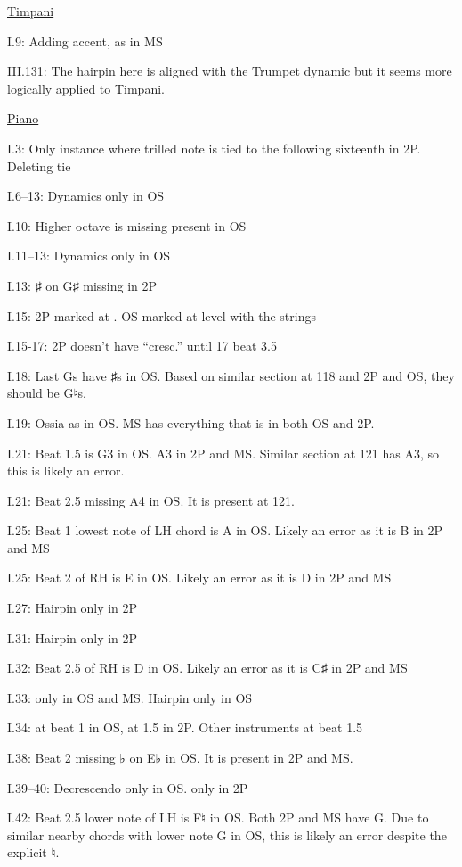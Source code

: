 \documentclass[twoside]{article}
\newcommand\dynmark[1]{\scalebox{0.9}{#1}{\kern1pt}}
\begin{document}
\begin{hangparas}{15pt}{1}
\begin{multicols}{2}
\underline{Timpani}

I.9: Adding accent, as in MS

III.131: The hairpin here is aligned with the Trumpet dynamic but it seems more logically applied to Timpani.

\underline{Piano}

I.3: Only instance where trilled note is tied to the following sixteenth in 2P. Deleting tie

I.6--13: Dynamics only in OS

I.10: Higher octave is missing present in OS

I.11--13: Dynamics only in OS

I.13: ♯ on G♯ missing in 2P

I.15: 2P marked at \dynmark{\pp}. OS marked at \dynmark{\p} level with the strings

I.15-17: 2P doesn't have ``cresc.'' until 17 beat 3.5

I.18: Last Gs have ♯s in OS. Based on similar section at 118 and 2P and OS, they should be G♮s.

I.19: Ossia as in OS. MS has everything that is in both OS and 2P.

I.21: Beat 1.5 is G3 in OS. A3 in 2P and MS. Similar section at 121 has A3, so this is likely an error.

I.21: Beat 2.5 missing A4 in OS. It is present at 121.

I.25: Beat 1 lowest note of LH chord is A in OS. Likely an error as it is B in 2P and MS

I.25: Beat 2 of RH is E in OS. Likely an error as it is D in 2P and MS

I.27: Hairpin only in 2P

I.31: Hairpin only in 2P

I.32: Beat 2.5 of RH is D in OS. Likely an error as it is C♯ in 2P and MS

I.33: \dynmark{\pp} only in OS and MS. Hairpin only in OS

I.34: \dynmark{\f} at beat 1 in OS, at 1.5 in 2P. Other instruments \dynmark{\f} at beat 1.5

I.38: Beat 2 missing ♭ on E♭ in OS. It is present in 2P and MS.

I.39--40: Decrescendo only in OS. \dynmark{\pp} only in 2P

I.42: Beat 2.5 lower note of LH is F♮ in OS. Both 2P and MS have G. Due to similar nearby chords with lower note G in OS, this is likely an error despite the explicit ♮.


\end{multicols}
\end{hangparas}
\end{document}
